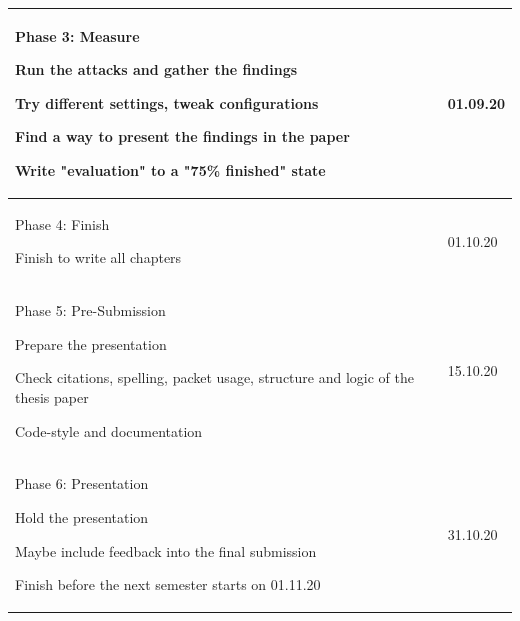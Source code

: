 \documentclass[
	ngerman,
	ruledheaders=section,%
	class=report,%
	thesis={type=bachelor},%
	accentcolor=1b,%
	custommargins=true,%
	marginpar=false,%
	parskip=half-,%
	fontsize=11pt,%
]{tudapub}
\newenvironment{myitemize}
{ \begin{compactitem}
    \setlength{\itemsep}{0pt}
    \setlength{\parskip}{0pt}
    \setlength{\parsep}{0pt}
    }
{ \end{compactitem}                  }
\begin{document}
\begin{appendix}
\begin{longtable}[H]{ | L{13cm} | l |}
 Phase 3: Measure  
 \begin{myitemize}
     \item Run the attacks and gather the findings
     \item Try different settings, tweak configurations
     \item Find a way to present the findings in the paper
     \item Write "evaluation" to a "75\% finished" state
 \end{myitemize}  
 & 01.09.20  \\  \hline
 
 Phase 4: Finish  
 \begin{myitemize}
     \item Finish to write all chapters
 \end{myitemize}  
 & 01.10.20   \\  \hline
 
 Phase 5: Pre-Submission  
 \begin{myitemize}
     \item Prepare the presentation
     \item Check citations, spelling, packet usage, structure and logic of the thesis paper
     \item Code-style and documentation 
 \end{myitemize}  
 & 15.10.20   \\  \hline
 
 Phase 6: Presentation  
 \begin{myitemize}
     \item Hold the presentation
     \item Maybe include feedback into the final submission
     \item Finish before the next semester starts on 01.11.20
 \end{myitemize}  
 & 31.10.20  \\  \hline

\end{longtable}



\end{appendix}
	
\end{document}
